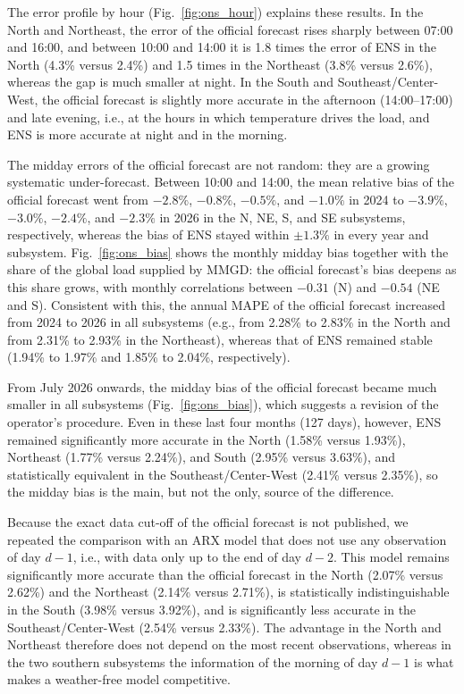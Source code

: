 The error profile by hour (Fig.~\ref{fig:ons_hour}) explains these results. In the North and Northeast, the error of the official forecast rises sharply between 07:00 and 16:00, and between 10:00 and 14:00 it is 1.8 times the error of ENS in the North (4.3\% versus 2.4\%) and 1.5 times in the Northeast (3.8\% versus 2.6\%), whereas the gap is much smaller at night. In the South and Southeast/Center-West, the official forecast is slightly more accurate in the afternoon (14:00--17:00) and late evening, i.e., at the hours in which temperature drives the load, and ENS is more accurate at night and in the morning.

The midday errors of the official forecast are not random: they are a growing systematic under-forecast. Between 10:00 and 14:00, the mean relative bias of the official forecast went from $-2.8\%$, $-0.8\%$, $-0.5\%$, and $-1.0\%$ in 2024 to $-3.9\%$, $-3.0\%$, $-2.4\%$, and $-2.3\%$ in 2026 in the N, NE, S, and SE subsystems, respectively, whereas the bias of ENS stayed within $\pm1.3\%$ in every year and subsystem. Fig.~\ref{fig:ons_bias} shows the monthly midday bias together with the share of the global load supplied by MMGD: the official forecast's bias deepens as this share grows, with monthly correlations between $-0.31$ (N) and $-0.54$ (NE and S). Consistent with this, the annual MAPE of the official forecast increased from 2024 to 2026 in all subsystems (e.g., from 2.28\% to 2.83\% in the North and from 2.31\% to 2.93\% in the Northeast), whereas that of ENS remained stable (1.94\% to 1.97\% and 1.85\% to 2.04\%, respectively).

From July 2026 onwards, the midday bias of the official forecast became much smaller in all subsystems (Fig.~\ref{fig:ons_bias}), which suggests a revision of the operator's procedure. Even in these last four months (127 days), however, ENS remained significantly more accurate in the North (1.58\% versus 1.93\%), Northeast (1.77\% versus 2.24\%), and South (2.95\% versus 3.63\%), and statistically equivalent in the Southeast/Center-West (2.41\% versus 2.35\%), so the midday bias is the main, but not the only, source of the difference.

Because the exact data cut-off of the official forecast is not published, we repeated the comparison with an ARX model that does not use any observation of day $d-1$, i.e., with data only up to the end of day $d-2$. This model remains significantly more accurate than the official forecast in the North (2.07\% versus 2.62\%) and the Northeast (2.14\% versus 2.71\%), is statistically indistinguishable in the South (3.98\% versus 3.92\%), and is significantly less accurate in the Southeast/Center-West (2.54\% versus 2.33\%). The advantage in the North and Northeast therefore does not depend on the most recent observations, whereas in the two southern subsystems the information of the morning of day $d-1$ is what makes a weather-free model competitive.

